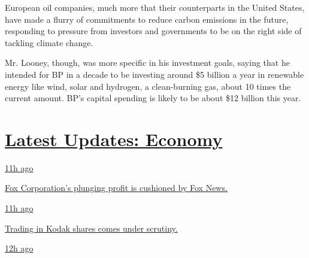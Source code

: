 European oil companies, much more that their counterparts in the United
States, have made a flurry of commitments to reduce carbon emissions in
the future, responding to pressure from investors and governments to be
on the right side of tackling climate change.

Mr. Looney, though, was more specific in his investment goals, saying
that he intended for BP in a decade to be investing around \$5 billion a
year in renewable energy like wind, solar and hydrogen, a clean-burning
gas, about 10 times the current amount. BP's capital spending is likely
to be about \$12 billion this year.

\hypertarget{latest-updates-economy}{%
\section{\texorpdfstring{\href{https://www.nytimes.com/live/2020/08/04/business/stock-market-today-coronavirus?action=click\&pgtype=Article\&state=default\&region=MAIN_CONTENT_1\&context=storylines_live_updates}{Latest
Updates:
Economy}}{Latest Updates: Economy}}\label{latest-updates-economy}}

\href{https://www.nytimes.com/live/2020/08/04/business/stock-market-today-coronavirus?action=click\&pgtype=Article\&state=default\&region=MAIN_CONTENT_1\&context=storylines_live_updates\#fox-corporations-plunging-profit-is-cushioned-by-fox-news}{11h
ago}

\href{https://www.nytimes.com/live/2020/08/04/business/stock-market-today-coronavirus?action=click\&pgtype=Article\&state=default\&region=MAIN_CONTENT_1\&context=storylines_live_updates\#fox-corporations-plunging-profit-is-cushioned-by-fox-news}{Fox
Corporation's plunging profit is cushioned by Fox News.}

\href{https://www.nytimes.com/live/2020/08/04/business/stock-market-today-coronavirus?action=click\&pgtype=Article\&state=default\&region=MAIN_CONTENT_1\&context=storylines_live_updates\#trading-in-kodak-shares-comes-under-scrutiny}{11h
ago}

\href{https://www.nytimes.com/live/2020/08/04/business/stock-market-today-coronavirus?action=click\&pgtype=Article\&state=default\&region=MAIN_CONTENT_1\&context=storylines_live_updates\#trading-in-kodak-shares-comes-under-scrutiny}{Trading
in Kodak shares comes under scrutiny.}

\href{https://www.nytimes.com/live/2020/08/04/business/stock-market-today-coronavirus?action=click\&pgtype=Article\&state=default\&region=MAIN_CONTENT_1\&context=storylines_live_updates\#disney-lost-4-7-billion-last-quarter-but-its-newest-business-was-a-big-hit}{12h
ago}

